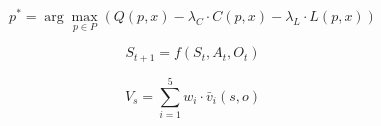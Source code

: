 
\begin{equation}
\label{eq:routing}
p^* = \arg \max_{p \in P} \left( Q(p, x) - \lambda_C \cdot C(p, x) - \lambda_L \cdot L(p, x) \right)
\end{equation}

\begin{equation}
\label{eq:state-transition}
S_{t+1} = f(S_t, A_t, O_t)
\end{equation}

\begin{equation}
\label{eq:strategy-score}
V_s = \sum_{i=1}^{5} w_i \cdot \bar{v}_i(s, o)
\end{equation}
